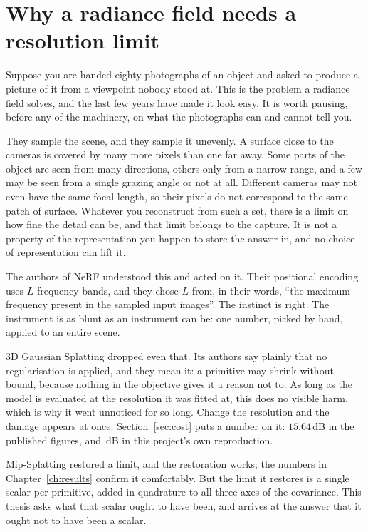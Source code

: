 \chapter{Why a radiance field needs a resolution limit}
\label{ch:intro}

Suppose you are handed eighty photographs of an object and asked to produce a
picture of it from a viewpoint nobody stood at. This is the problem a radiance
field solves, and the last few years have made it look easy. It is worth
pausing, before any of the machinery, on what the photographs can and cannot
tell you.

They sample the scene, and they sample it unevenly. A surface close to the
cameras is covered by many more pixels than one far away. Some parts of the
object are seen from many directions, others only from a narrow range, and a few
may be seen from a single grazing angle or not at all. Different cameras may not
even have the same focal length, so their pixels do not correspond to the same
patch of surface. Whatever you reconstruct from such a set, there is a limit on
how fine the detail can be, and that limit belongs to the capture. It is not a
property of the representation you happen to store the answer in, and no choice
of representation can lift it.

The authors of NeRF understood this and acted on it. Their positional encoding
uses $L$ frequency bands, and they chose $L$ from, in their words, ``the maximum
frequency present in the sampled input images''. The instinct is right.
The instrument is as blunt as an instrument can be: one number, picked by hand,
applied to an entire scene.

3D Gaussian Splatting dropped even that. Its authors say plainly that no
regularisation is applied, and they mean it: a primitive may shrink without
bound, because nothing in the objective gives it a reason not to. As long as the
model is evaluated at the resolution it was fitted at, this does no visible harm, which is why it went unnoticed for so long. Change the
resolution and the damage appears at once. Section~\ref{sec:cost} puts a number
on it: $15.64$\,dB in the published figures, and \StmtArmBDrop\,dB in this
project's own reproduction.

Mip-Splatting restored a limit, and the restoration works; the numbers in
Chapter~\ref{ch:results} confirm it comfortably. But the limit it restores is a
single scalar per primitive, added in quadrature to all three axes of the
covariance. This thesis asks what that scalar ought to have been, and arrives at
the answer that it ought not to have been a scalar.

